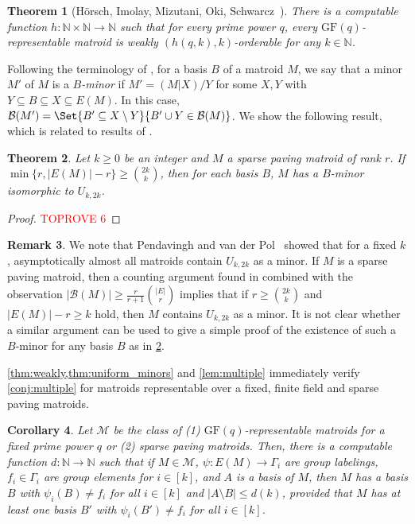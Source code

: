 \documentclass{article}
\newtheorem{theorem}{Theorem}[section]
\newtheorem{corollary}[theorem]{Corollary}
\theoremstyle{definition}
\newtheorem{remark}[theorem]{Remark}
\newcommand{\GF}{\mathrm{GF}}
\newcommand{\N}{\mathbb{N}}
\begin{document}
\begin{theorem}[Hörsch, Imolay, Mizutani, Oki, Schwarcz~\cite{horsch2024problems}] \label{thm:weakly}
    There is a computable function $h\colon \N\times \N \to \N$ such that for every prime power $q$, every $\GF(q)$-representable matroid is weakly $(h(q,k),k)$-orderable for any $k \in \N$.
\end{theorem}

Following the terminology of \cite{horsch2024problems}, for a basis $B$ of a matroid $M$, we say that a minor $M'$ of $M$ is a \textit{$B$-minor} if $M' = (M|X)/Y$ for some $X, Y$ with $Y \subseteq B \subseteq X \subseteq E(M)$.
In this case, $\mathcal{B}(M') = \Set{B' \subseteq X \setminus Y}{B' \cup Y \in \mathcal{B}(M)}$. We show the following result, which is related to results of \cite{pendavingh2018number}.

\begin{theorem}
\label{thm:uniform_minors}
    Let $k\ge 0$ be an integer and $M$ a sparse paving matroid of rank $r$. If $\min\{r, |E(M)|-r\} \ge \binom{2k}{k}$, then for each basis $B$, $M$ has a $B$-minor isomorphic to $U_{k, 2k}$.
\end{theorem}

\begin{proof}\textcolor{red}{TOPROVE 6}\end{proof}

\begin{remark}
We note that Pendavingh and van der Pol~\cite{pendavingh2018number} showed that for a fixed $k$, asymptotically almost all matroids contain $U_{k,2k}$ as a minor. If $M$ is a sparse paving matroid, then a counting argument found in \cite[Lemma~4.7]{pendavingh2018number} combined with the observation $|\mathcal{B}(M)| \ge \frac{r}{r+1} \binom{|E|}{r}$ implies that if $r \ge \binom{2k}{k}$ and $|E(M)|-r \ge k$ hold, then $M$ contains $U_{k,2k}$ as a minor. It is not clear whether a similar argument can be used to give a simple proof of the existence of such a $B$-minor for any basis $B$ as in \cref{thm:uniform_minors}.
\end{remark}

\cref{thm:weakly,thm:uniform_minors} and \cref{lem:multiple} immediately verify \cref{conj:multiple} for matroids representable over a fixed, finite field and sparse paving matroids.

\begin{corollary}
\label{cor:gfq-multiple}
    Let $\mathcal{M}$ be the class of (1) $\GF(q)$-representable matroids for a fixed prime power $q$ or (2) sparse paving matroids.
    Then, there is a computable function $d \colon \N \to \N$ such that if $M \in \mathcal{M}$, $\psi\colon E(M)\to \Gamma_i$ are group labelings, $f_i \in \Gamma_i$ are group elements for $i \in [k]$, and $A$ is a basis of $M$, then $M$ has a basis $B$ with $\psi_i(B) \ne f_i$ for all $i \in [k]$ and $|A\setminus B| \le d(k)$, provided that $M$ has at least one basis $B'$ with $\psi_i(B') \ne f_i$ for all $i \in [k]$.
\end{corollary}
\end{document}
